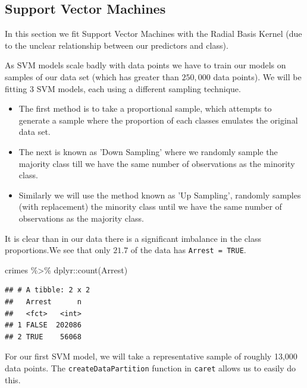 \documentclass[
]{article}
\newenvironment{Shaded}{\begin{snugshade}}{\end{snugshade}}
\newcommand{\FunctionTok}[1]{\textcolor[rgb]{0.00,0.00,0.00}{#1}}
\newcommand{\NormalTok}[1]{#1}
\newcommand{\SpecialCharTok}[1]{\textcolor[rgb]{0.00,0.00,0.00}{#1}}
\begin{document}
\subsection{Support Vector Machines}

In this section we fit Support Vector Machines with the Radial Basis
Kernel (due to the unclear relationship between our predictors and
class).

As SVM models scale badly with data points we have to train our models
on samples of our data set (which has greater than \(250,000\) data
points). We will be fitting 3 SVM models, each using a different
sampling technique.

\begin{itemize}
    \item The first method is to take a proportional sample, which attempts to generate a sample where the proportion of each classes emulates the original data set.
    \item The next is known as 'Down Sampling' where we randomly sample the majority class till we have the same number of observations as the minority class.
    \item Similarly we will use the method known as 'Up Sampling', randomly samples (with replacement) the minority class until we have the same number of observations as the majority class.
\end{itemize}

It is clear than in our data there is a significant imbalance in the
class proportions.We see that only \(21.7%
\) of the data has \texttt{Arrest\ =\ TRUE}.

\begin{Shaded}
\begin{Highlighting}[]
\NormalTok{crimes }\SpecialCharTok{\%\textgreater{}\%}\NormalTok{ dplyr}\SpecialCharTok{::}\FunctionTok{count}\NormalTok{(Arrest)}
\end{Highlighting}
\end{Shaded}

\begin{verbatim}
## # A tibble: 2 x 2
##   Arrest      n
##   <fct>   <int>
## 1 FALSE  202086
## 2 TRUE    56068
\end{verbatim}

For our first SVM model, we will take a representative sample of roughly
13,000 data points. The \texttt{createDataPartition} function in
\texttt{caret} allows us to easily do this.
\end{document}
